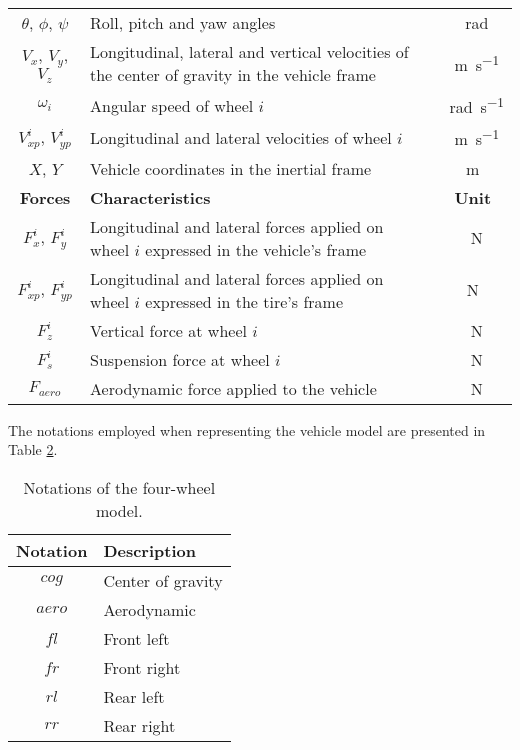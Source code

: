 \documentclass[journal]{IEEEtran}
\begin{document}
\begin{table}
\begin{tabularx}{\columnwidth}{cXc}
      $\theta$, $\phi$, $\psi$ & Roll, pitch and yaw angles & \SI{}{\radian}\\
      $V_x$, $V_y$, $V_z$ & Longitudinal, lateral and vertical velocities of the center of gravity in the vehicle frame & \SI{}{\meter\per\second}\\
      $\omega_i$ & Angular speed of wheel $i$ & \SI{}{\radian\per\second}\\
      $V_{xp}^{i}$, $V_{yp}^{i}$ & Longitudinal and lateral velocities of wheel $i$ & \SI{}{\meter\per\second}\\
      $X$, $Y$& Vehicle coordinates in the inertial frame& m\\
      
      \midrule
      \textbf{Forces} & \textbf{Characteristics} &\textbf{Unit}\\
      \midrule
      $F_{x}^{i}$, $F_{y}^{i}$ & Longitudinal and lateral forces applied on wheel $i$ expressed in the vehicle's frame & \SI{}{\newton}\\
      $F_{xp}^{i}$, $F_{yp}^{i}$ & Longitudinal and lateral forces applied on wheel $i$ expressed in the tire's frame & N\\
      $F_{z}^{i}$ & Vertical force at wheel $i$ & \SI{}{\newton}\\
      $F_{s}^{i}$ & Suspension force at wheel $i$ & \SI{}{\newton}\\
      $F_{aero}$ & Aerodynamic force applied to the vehicle & \SI{}{\newton}\\
      \bottomrule
    \end{tabularx}
\label{fourWheelParameters.tab}
\end{table}
The notations employed when representing the vehicle model are presented in Table \ref{fourWheelNotations.tab}.

\begin{table}
  \centering
  \caption{Notations of the four-wheel model.}
  \begin{adjustbox}{width=.8\columnwidth}
    \begin{tabular}{cp{}}
      \toprule
      \textbf{Notation} & \textbf{Description}\\
      \midrule
      $cog$ & Center of gravity \\
      $aero$ & Aerodynamic \\
      $fl$ & Front left \\
      $fr$ & Front right \\
      $rl$ & Rear left \\
      $rr$ & Rear right \\
    \bottomrule
    \end{tabular}
     \end{adjustbox}    

\label{fourWheelNotations.tab}
\end{table}
\end{document}
